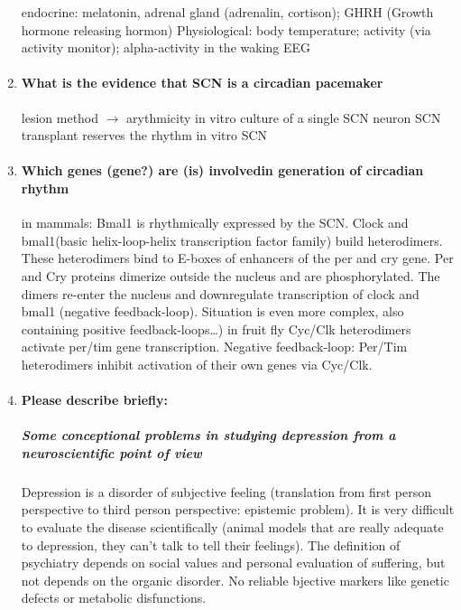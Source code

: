 \documentclass[12pt,article,oneside,a4paper]{memoir}
\begin{document}
\begin{enumerate}
endocrine: melatonin, adrenal gland (adrenalin, cortison); GHRH (Growth hormone releasing hormon)
	Physiological: body temperature; activity (via activity monitor); alpha-activity in the waking EEG

\item \paragraph{What is the evidence that SCN is a circadian pacemaker}

lesion method $\rightarrow$ arythmicity
         in vitro culture of a single SCN neuron    
         SCN transplant reserves the rhythm
         in vitro SCN

\item \paragraph{Which genes (gene?) are (is) involvedin generation of circadian rhythm}

in mammals: Bmal1 is rhythmically expressed by the SCN. Clock and bmal1(basic helix-loop-helix transcription factor family) build heterodimers. These heterodimers bind to E-boxes of enhancers of the per and cry gene. Per and Cry proteins dimerize outside the nucleus and are phosphorylated. The dimers re-enter the nucleus and downregulate transcription of  clock and bmal1 (negative feedback-loop). Situation is even more complex, also containing positive feedback-loops…)
        in fruit fly Cyc/Clk heterodimers activate per/tim gene transcription. Negative feedback-loop: Per/Tim heterodimers inhibit activation of their own genes via Cyc/Clk.

\item \paragraph{Please describe briefly:} \subparagraph{Some conceptional problems in studying depression from a neuroscientific point of view} 

Depression is a disorder of subjective feeling (translation from first person perspective to third person perspective: epistemic problem). It is very difficult to evaluate the disease scientifically (animal models that are really adequate to depression, they can’t talk to tell their feelings). The definition of psychiatry depends on social values and personal evaluation of suffering, but not depends on the organic disorder. No reliable bjective markers like genetic defects or metabolic disfunctions.


\end{enumerate}
\end{document}
